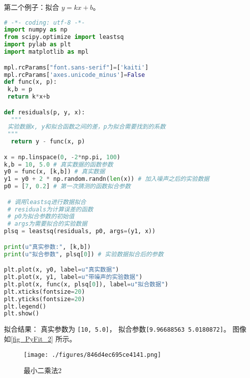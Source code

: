 第二个例子：拟合 $y=kx+b$。
\begin{lstlisting}[language=python]
# -*- coding: utf-8 -*-
import numpy as np
from scipy.optimize import leastsq
import pylab as plt
import matplotlib as mpl

mpl.rcParams["font.sans-serif"]=['kaiti']
mpl.rcParams['axes.unicode_minus']=False
def func(x, p):
 k,b = p
 return k*x+b

def residuals(p, y, x):
  """
 实验数据x, y和拟合函数之间的差，p为拟合需要找到的系数
 """
  return y - func(x, p)

x = np.linspace(0, -2*np.pi, 100)
k,b = 10, 5.0 # 真实数据的函数参数
y0 = func(x, [k,b]) # 真实数据
y1 = y0 + 2 * np.random.randn(len(x)) # 加入噪声之后的实验数据
p0 = [7, 0.2] # 第一次猜测的函数拟合参数

 # 调用leastsq进行数据拟合
 # residuals为计算误差的函数
 # p0为拟合参数的初始值
 # args为需要拟合的实验数据
plsq = leastsq(residuals, p0, args=(y1, x))

print(u"真实参数:", [k,b])
print(u"拟合参数", plsq[0]) # 实验数据拟合后的参数

plt.plot(x, y0, label=u"真实数据")
plt.plot(x, y1, label=u"带噪声的实验数据")
plt.plot(x, func(x, plsq[0]), label=u"拟合数据")
plt.xticks(fontsize=20)
plt.yticks(fontsize=20)
plt.legend()
plt.show()
\end{lstlisting}
拟合结果： 真实参数为 \verb`[10, 5.0]`， 拟合参数\verb`[9.96688563 5.0180872]`。 图像如\autoref{fig_PyFit_2} 所示。
\begin{figure}[ht]
\centering
\texttt{[image: ./figures/846d4ec695ce4141.png]}
\caption{最小二乘法2} \label{fig_PyFit_2}
\end{figure}

